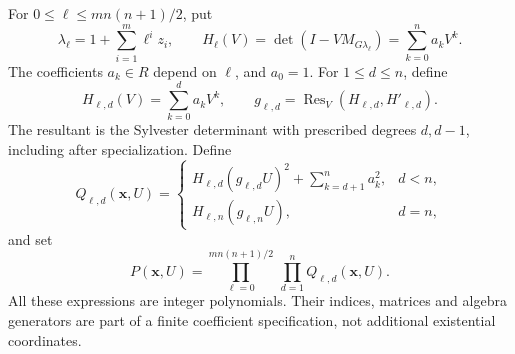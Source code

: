 \documentclass[11pt,a4paper]{article}
\DeclareMathOperator{\Res}{Res}
\begin{document}
For $0\le\ell\le m n(n+1)/2$, put
\[
 \lambda_\ell=1+\sum_{i=1}^m\ell^i z_i,
 \qquad H_\ell(V)=\det(I-VM_{G\lambda_\ell})
                   =\sum_{k=0}^n a_kV^k.
\]
The coefficients $a_k\in R$ depend on $\ell$, and $a_0=1$.
For $1\le d\le n$, define
\[
 H_{\ell,d}(V)=\sum_{k=0}^d a_kV^k,
 \qquad g_{\ell,d}=\Res_V(H_{\ell,d},H'_{\ell,d}).
\]
The resultant is the Sylvester determinant with prescribed degrees
$d,d-1$, including after specialization. Define
\begin{equation}\label{eq:factor}
 Q_{\ell,d}(\mathbf x,U)=
 \begin{cases}
 H_{\ell,d}(g_{\ell,d}U)^2+\displaystyle\sum_{k=d+1}^n a_k^2,
       & d<n,\\[2mm]
 H_{\ell,n}(g_{\ell,n}U),&d=n,
 \end{cases}
\end{equation}
and set
\begin{equation}\label{eq:product}
 P(\mathbf x,U)=
 \prod_{\ell=0}^{m n(n+1)/2}\ \prod_{d=1}^n Q_{\ell,d}(\mathbf x,U).
\end{equation}
All these expressions are integer polynomials. Their indices, matrices
and algebra generators are part of a finite coefficient specification,
not additional existential coordinates.
\end{document}
